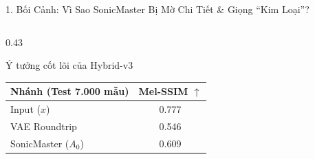 \documentclass[aspectratio=169,10pt]{beamer}
\begin{document}
\begin{frame}{1. Bối Cảnh: Vì Sao SonicMaster Bị Mờ Chi Tiết \& Giọng ``Kim Loại''?}
\begin{columns}[T]
\begin{column}{0.43\textwidth}
\begin{exampleblock}{Ý tưởng cốt lõi của Hybrid-v3}
\begin{enumerate}
        \end{enumerate}
      \end{exampleblock}
      \vspace{0.4em}
      \centering
      \begin{tabular}{lc}
        \toprule
        \textbf{Nhánh (Test 7.000 mẫu)} & \textbf{Mel-SSIM} $\uparrow$ \\
        \midrule
        Input ($x$) & 0.777 \\
        VAE Roundtrip & 0.546 \\
        SonicMaster ($A_0$) & 0.609 \\
        \bottomrule
      \end{tabular}
    \end{column}
  \end{columns}
\end{frame}
\end{document}

